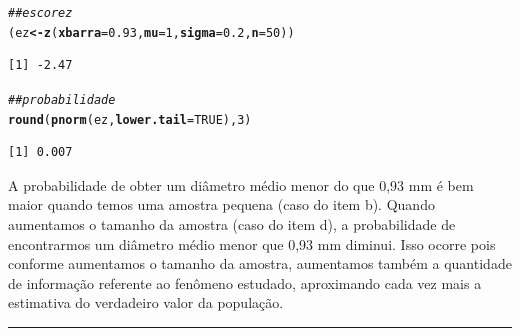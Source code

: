 \documentclass[a4paper,11pt,fleqn]{article}\usepackage[]{graphicx}\usepackage[]{color}
\makeatletter
\newcommand{\hlnum}[1]{\textcolor[rgb]{0,0,0}{#1}}%
\newcommand{\hlcom}[1]{\textcolor[rgb]{0.4,0.4,0.4}{\textit{#1}}}%
\newcommand{\hlstd}[1]{\textcolor[rgb]{0,0,0}{#1}}%
\newcommand{\hlkwb}[1]{\textcolor[rgb]{0,0,0}{\textbf{#1}}}%
\newcommand{\hlkwc}[1]{\textcolor[rgb]{0,0,0}{\textbf{#1}}}%
\newcommand{\hlkwd}[1]{\textcolor[rgb]{0,0,0}{\textbf{#1}}}%
\newenvironment{kframe}{%
 \def\at@end@of@kframe{}%
 \ifinner\ifhmode%
  \def\at@end@of@kframe{\end{minipage}}%
  \begin{minipage}{\columnwidth}%
 \fi\fi%
 \def\FrameCommand##1{\hskip\@totalleftmargin \hskip-\fboxsep
 \colorbox{shadecolor}{##1}\hskip-\fboxsep
     \hskip-\linewidth \hskip-\@totalleftmargin \hskip\columnwidth}%
 \MakeFramed {\advance\hsize-\width
   \@totalleftmargin\z@ \linewidth\hsize
   \@setminipage}}%
 {\par\unskip\endMakeFramed%
 \at@end@of@kframe}
\newenvironment{knitrout}{}{} %
\theoremstyle{definition}
\makeatother
\begin{document}
\begin{compactenum}[1.]
\begin{compactenum}
\begin{knitrout}
\color{fgcolor}\begin{kframe}
\begin{alltt}
\hlcom{## escore z}
\hlstd{(ez} \hlkwb{<-} \hlkwd{z}\hlstd{(}\hlkwc{xbarra} \hlstd{=} \hlnum{0.93}\hlstd{,} \hlkwc{mu} \hlstd{=} \hlnum{1}\hlstd{,} \hlkwc{sigma} \hlstd{=} \hlnum{0.2}\hlstd{,} \hlkwc{n} \hlstd{=} \hlnum{50}\hlstd{))}
\end{alltt}
\begin{verbatim}
[1] -2.47
\end{verbatim}
\begin{alltt}
\hlcom{## probabilidade}
\hlkwd{round}\hlstd{(}\hlkwd{pnorm}\hlstd{(ez,} \hlkwc{lower.tail} \hlstd{=} \hlnum{TRUE}\hlstd{),} \hlnum{3}\hlstd{)}
\end{alltt}
\begin{verbatim}
[1] 0.007
\end{verbatim}
\end{kframe}
\end{knitrout}
A probabilidade de obter um diâmetro médio menor do que
0,93 mm é bem maior quando temos uma amostra pequena (caso do item
b). Quando aumentamos o tamanho da amostra (caso do item d), a
probabilidade de encontrarmos um diâmetro médio menor que 0,93 mm
diminui. Isso ocorre pois conforme aumentamos o tamanho da amostra,
aumentamos também a quantidade de informação referente ao fenômeno
estudado, aproximando cada vez mais a estimativa do verdadeiro valor
da população.
  \end{compactenum}
\end{compactenum}

\vspace{0.3cm}
\hrule
\vspace{0.3cm}
\end{document}
